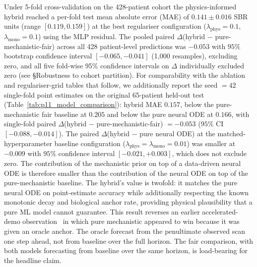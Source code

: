 Under 5-fold cross-validation on the 428-patient cohort the physics-informed hybrid reached a per-fold test mean absolute error (MAE) of $0.141 \pm 0.016$ SBR units (range $[0.119, 0.159]$) at the best regulariser configuration ($\lambda_{\mathrm{phys}} = 0.1$, $\lambda_{\mathrm{mono}} = 0.1$) using the MLP residual. The pooled paired $\Delta$(hybrid $-$ pure-mechanistic-fair) across all 428 patient-level predictions was $-0.053$ with $95\%$ bootstrap confidence interval $[-0.065, -0.041]$ (1{,}000 resamples), excluding zero, and all five fold-wise 95\% confidence intervals on $\Delta$ individually excluded zero (see \S Robustness to cohort partition). For comparability with the ablation and regulariser-grid tables that follow, we additionally report the seed $=42$ single-fold point estimates on the original 65-patient held-out test (Table~\ref{tab:p11_model_comparison}): hybrid MAE $0.157$, below the pure-mechanistic fair baseline at $0.205$ and below the pure neural ODE at $0.166$, with single-fold paired $\Delta$(hybrid $-$ pure-mechanistic-fair) $= -0.053$ ($95\%$ CI $[-0.088, -0.014]$). The paired $\Delta$(hybrid $-$ pure neural ODE) at the matched-hyperparameter baseline configuration ($\lambda_{\mathrm{phys}} = \lambda_{\mathrm{mono}} = 0.01$) was smaller at $-0.009$ with $95\%$ confidence interval $[-0.021, +0.003]$, which does not exclude zero. The contribution of the mechanistic prior on top of a data-driven neural ODE is therefore smaller than the contribution of the neural ODE on top of the pure-mechanistic baseline. The hybrid's value is twofold: it matches the pure neural ODE on point-estimate accuracy while additionally respecting the known monotonic decay and biological anchor rate, providing physical plausibility that a pure ML model cannot guarantee. This result reverses an earlier accelerated-demo observation~\cite{dupre2026dissertation} in which pure mechanistic appeared to win because it was given an oracle anchor. The oracle forecast from the penultimate observed scan one step ahead, not from baseline over the full horizon. The fair comparison, with both models forecasting from baseline over the same horizon, is load-bearing for the headline claim.

